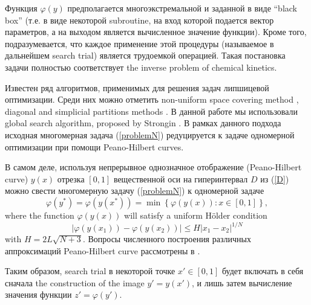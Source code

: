 \documentclass{svproc}
\begin{document}

Функция $\varphi(y)$ предполагается многоэкстремальной и заданной в виде ``black box'' (т.е. в виде некоторой subroutine, на вход которой подается вектор параметров, а на выходом является вычисленное значение функции). Кроме того, подразумевается, что каждое применение этой процедуры (называемое в дальнейшем search trial) является трудоемкой операцией. Такая постановка задачи полностью соответствует the inverse problem of chemical kinetics.



Известен ряд алгоритмов, применимых для решения задач липшицевой оптимизации. Среди них можно отметить non-uniform space covering method \cite{Evtushenko2013,Evtushenko2009}, diagonal and simplicial partitions methods \cite{Zilinskas2010,Paulavicius2011}. 
В данной работе мы использовали global search algorithm, proposed by Strongin \cite{Strongin2000}.
В рамках данного подхода исходная многомерная задача (\ref{problemN}) редуцируется к задаче одномерной оптимизации при помощи Peano-Hilbert curves. 

В самом деле, используя непрерывное однозначное отображение (Peano-Hilbert curve) $y(x)$ отрезка $[0,1]$ вещественной оси на гиперинтервал $D$ из (\ref{D}) можно свести многомерную задачу (\ref{problemN}) к одномерной задаче
\[
\varphi(y^\ast)=\varphi(y(x^\ast))=\min{\left\{\varphi(y(x)): x\in[0,1]\right\}},
\]
where the function $\varphi(y(x))$ will satisfy a uniform H{\"o}lder condition
\[
\left|\varphi(y(x_1))-\varphi(y(x_2))\right|\leq H\left|x_1-x_2\right|^{1/N}
\]
with $ H=2 L \sqrt{N+3}$.
Вопросы численного построения различных аппроксимаций Peano-Hilbert curve рассмотрены в \cite{Strongin2000,Sergeyev2013}.

Таким образом, search trial в некоторой точке $x'\in[0,1]$ будет включать в себя сначала the construction of the image $y'=y(x')$, и лишь затем вычисление значения функции $ z' = \varphi(y')$.
\end{document}

